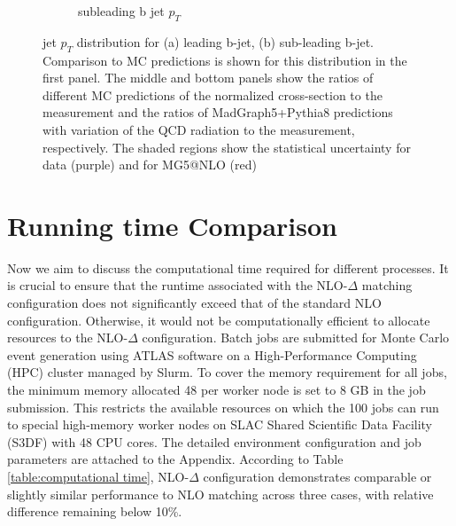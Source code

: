 \documentclass[NOTE, REPORT=true, atlasdraft=true, USenglish]{atlasdoc}
\begin{document}
\begin{figure}[htp]
\begin{minipage}{\linewidth}
\begin{subfigure}[t]{0.5\textwidth}
\caption{subleading b jet $p_T$}
\label{fig:ATLAS_2017_subleading_bjet_pT}
\end{subfigure}
\end{minipage}
\caption{jet $p_T$ distribution for (a) leading b-jet, (b) sub-leading b-jet.  Comparison to MC predictions is shown for this distribution in the first panel. The middle and bottom panels show the ratios of different MC predictions of the normalized cross-section to the measurement and the ratios of MadGraph5+Pythia8 predictions with variation of the QCD radiation to the measurement, respectively. The shaded regions show the statistical uncertainty for data (purple) and for MG5@NLO (red)}
\label{fig:ATLAS_2017_lead&subleading_bjet_pT}
\end{figure}




\section{Running time Comparison}


Now we aim to discuss the computational time required for different processes. It is crucial to ensure that the runtime associated with the NLO-$\Delta$ matching configuration does not significantly exceed that of the standard NLO configuration. Otherwise, it would not be computationally efficient to allocate resources to the NLO-$\Delta$ configuration. Batch jobs are submitted for Monte Carlo event generation using ATLAS software on a High-Performance Computing (HPC) cluster managed by Slurm. To cover the memory requirement for all jobs, the minimum memory allocated
48 per worker node is set to 8 GB in the job submission. This restricts the available resources on which the
100 jobs can run to special high-memory worker nodes on SLAC Shared Scientific Data Facility (S3DF) with 48 CPU cores. The detailed environment configuration and job parameters are attached to the Appendix. According to Table \ref{table:computational time}, NLO-$\Delta$ configuration demonstrates comparable or slightly similar performance to NLO matching across three cases, with relative difference remaining below 10\%. 
\end{document}
